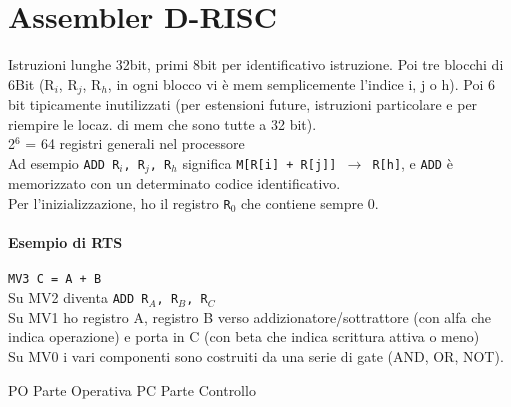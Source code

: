 \documentclass[10pt]{article}
\begin{document}
\section{Assembler D-RISC}
Istruzioni lunghe 32bit, primi 8bit per identificativo istruzione. Poi tre blocchi di 6Bit (R$_{i}$, R$_{j}$, R$_{h}$, in ogni blocco vi è mem semplicemente l'indice i, j o h). Poi 6 bit tipicamente inutilizzati (per estensioni future, istruzioni particolare e per riempire le locaz. di mem che sono tutte a 32 bit).\\
2$^{6}$ = 64 registri generali nel processore\\
Ad esempio \texttt{ADD R$_{i}$, R$_{j}$, R$_{h}$} significa \texttt{M[R[i] + R[j]] $\rightarrow$ R[h]}, e \texttt{ADD} è memorizzato con un determinato codice identificativo.\\
Per l'inizializzazione, ho il registro \texttt{R$_{0}$} che contiene sempre 0.\\

\paragraph{Esempio di RTS} \texttt{MV3 C = A + B}\\
Su MV2 diventa \texttt{ADD R$_{A}$, R$_{B}$, R$_{C}$}\\
Su MV1 ho registro A, registro B verso addizionatore/sottrattore (con alfa che indica operazione) e porta in C (con beta che indica scrittura attiva o meno)\\
Su MV0 i vari componenti sono costruiti da una serie di gate (AND, OR, NOT).

PO Parte Operativa
PC Parte Controllo
\end{document}
